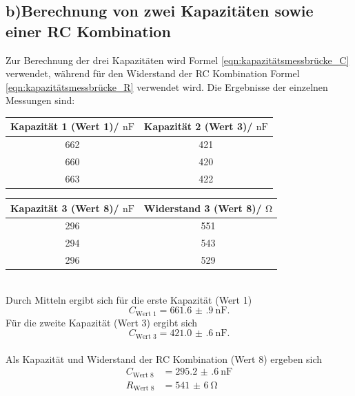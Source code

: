 \documentclass[
  bibliography=totoc,     %
  captions=tableheading,  %
  titlepage=firstiscover, %
]{scrartcl}
\begin{document}
\subsection{b)Berechnung von zwei Kapazitäten sowie einer RC Kombination}
Zur Berechnung der drei Kapazitäten wird Formel \eqref{eqn:kapazitätsmessbrücke_C}
verwendet, während für den Widerstand der RC Kombination Formel \eqref{eqn:kapazitätsmessbrücke_R} verwendet wird.
Die Ergebnisse der einzelnen Messungen sind:
\begin{table}
  \centering
  \label{tab:ergebnisse2.1}
  \begin{tabular}{c c}
    \toprule
    Kapazität 1 (Wert 1)/ $\si{\nano\farad}$ & Kapazität 2 (Wert 3)/ $\si{\nano\farad}$\\
    \midrule
    \num{662} & \num{421}\\
    \num{660} & \num{420}\\
    \num{663} & \num{422}\\
    \bottomrule
  \end{tabular}
\end{table}
\begin{table}
  \centering
  \label{tab:ergebnisse2.2}
  \begin{tabular}{c c}
    \toprule
    Kapazität 3 (Wert 8)/ $\si{\nano\farad}$ & Widerstand 3 (Wert 8)/ $\si{\ohm}$\\
    \midrule
    \num{296} & \num{551}\\
    \num{294} & \num{543}\\
    \num{296} & \num{529}\\
    \bottomrule
  \end{tabular}
\end{table}
\\
Durch Mitteln ergibt sich für die erste Kapazität (Wert 1)
\begin{equation}
  C_\text{Wert 1} = \SI{661.6(9)}{\nano\farad}.
\end{equation}
Für die zweite Kapazität (Wert 3) ergibt sich
\begin{equation}
  C_\text{Wert 3} = \SI{421.0(6)}{\nano\farad}.
\end{equation}
\\
Als Kapazität und Widerstand der RC Kombination (Wert 8) ergeben sich
\begin{align}
  C_\text{Wert 8} &= \SI{295.2(6)}{\nano\farad}\\
  R_\text{Wert 8} &= \SI{541(6)}{\ohm}
\end{align}
\end{document}
